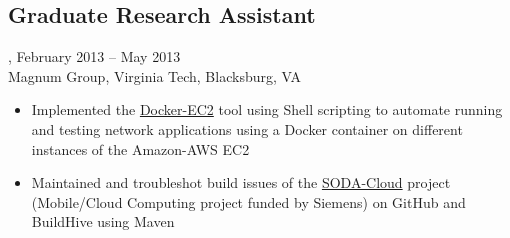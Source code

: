 \subsection{Graduate Research Assistant}, February 2013 -- May 2013\\
Magnum Group, Virginia Tech, Blacksburg, VA
\begin{itemize}
\item Implemented the \href{https://github.com/amrabed/docker-ec2}{Docker-EC2} tool using Shell scripting to automate running and testing network applications using a Docker container on different instances of the Amazon-AWS EC2
\item Maintained and troubleshot build issues of the \href{https://github.com/VT-Magnum-Research/sodacloud}{SODA-Cloud} project (Mobile/Cloud Computing project funded by Siemens) on GitHub and BuildHive using Maven
\end{itemize}
